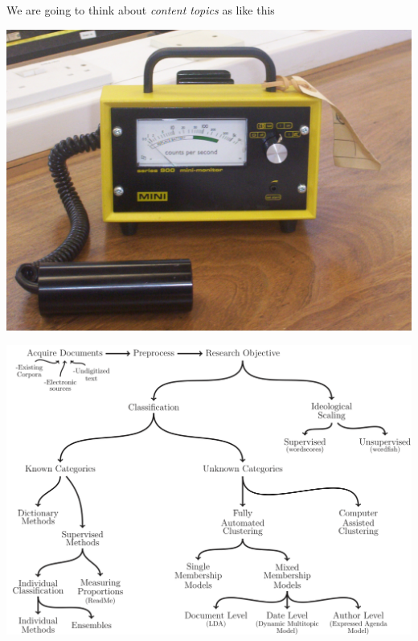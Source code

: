 \documentclass[11pt,compress,professionalfonts]{beamer}
\begin{document}

We are going to think about \textit{content topics} as like this


\centerline{\includegraphics[scale=.2]{pictures/geiger_counter}}


\centerline{\includegraphics[scale=.5]{pictures/tad-picture}}

\end{document}
